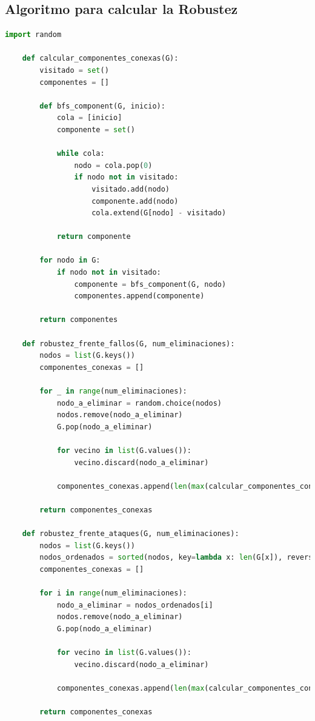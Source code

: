 \subsection{Algoritmo para calcular la Robustez}
\begin{lstlisting}[language=Python]
    import random

    def calcular_componentes_conexas(G):
        visitado = set()
        componentes = []
    
        def bfs_component(G, inicio):
            cola = [inicio]
            componente = set()
    
            while cola:
                nodo = cola.pop(0)
                if nodo not in visitado:
                    visitado.add(nodo)
                    componente.add(nodo)
                    cola.extend(G[nodo] - visitado)
    
            return componente
    
        for nodo in G:
            if nodo not in visitado:
                componente = bfs_component(G, nodo)
                componentes.append(componente)
    
        return componentes
    
    def robustez_frente_fallos(G, num_eliminaciones):
        nodos = list(G.keys())
        componentes_conexas = []
    
        for _ in range(num_eliminaciones):
            nodo_a_eliminar = random.choice(nodos)
            nodos.remove(nodo_a_eliminar)
            G.pop(nodo_a_eliminar)
            
            for vecino in list(G.values()):
                vecino.discard(nodo_a_eliminar)
    
            componentes_conexas.append(len(max(calcular_componentes_conexas(G), key=len)))
    
        return componentes_conexas
    
    def robustez_frente_ataques(G, num_eliminaciones):
        nodos = list(G.keys())
        nodos_ordenados = sorted(nodos, key=lambda x: len(G[x]), reverse=True)
        componentes_conexas = []
    
        for i in range(num_eliminaciones):
            nodo_a_eliminar = nodos_ordenados[i]
            nodos.remove(nodo_a_eliminar)
            G.pop(nodo_a_eliminar)
            
            for vecino in list(G.values()):
                vecino.discard(nodo_a_eliminar)
    
            componentes_conexas.append(len(max(calcular_componentes_conexas(G), key=len)))
    
        return componentes_conexas
\end{lstlisting}

